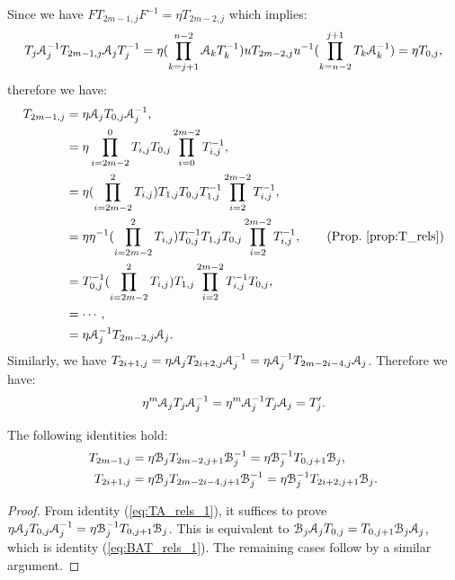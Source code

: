\documentclass{amsart}
\begin{document}
Since we have $FT_{2m-1,j}F^{-1}=\eta T_{2m-2,j}$ which implies: \[T_j\AA^{-1}_jT_{2m-1,j}\AA_jT_j^{-1}=\eta(\prod ^{n-2}_{k=j+1}\AA_kT_k^{-1}) uT_{2m-2,j}u^{-1}(\prod ^{j+1}_{k=n-2}T_k\AA^{-1}_k)=\eta T_{0,j},\] therefore we have:
\begin{equation}\label{eq:TA_rels_1}
\begin{aligned}
T_{2m-1,j}&=\eta \AA_jT_{0,j}\AA^{-1}_j,\\
&=\eta\prod^{0}_{i=2m-2}T_{i,j}T_{0,j}\prod^{2m-2}_{i=0}T^{-1}_{i,j},\\
&=\eta(\prod^{2}_{i=2m-2}T_{i,j})T_{1,j}T_{0,j}T^{-1}_{1,j}\prod^{2m-2}_{i=2}T^{-1}_{i,j},\\
&=\eta\eta^{-1}(\prod^{2}_{i=2m-2}T_{i,j})T^{-1}_{0,j}T_{1,j}T_{0,j}\prod^{2m-2}_{i=2}T^{-1}_{i,j},\qquad (\text{Prop.~\ref{prop:T_rels}})\\
&=T^{-1}_{0,j}(\prod^{2}_{i=2m-2}T_{i,j})T_{1,j}\prod^{2m-2}_{i=2}T^{-1}_{i,j}T_{0,j},\\
&=\cdots,\\
&=\eta \AA^{-1}_jT_{2m-2,j}\AA_j.     
\end{aligned}
\end{equation}
Similarly, we have $T_{2i+1,j}=\eta \AA_jT_{2i+2,j}\AA^{-1}_j=\eta \AA^{-1}_jT_{2m-2i-4,j}\AA_j$. Therefore we have:
\begin{equation}
\eta^{m} \AA_jT_j\AA^{-1}_j=\eta^{m} \AA^{-1}_jT_j\AA_j=T'_j.    
\end{equation}

\begin{lem}
The following identities hold:
\begin{align}
T_{2m-1,j}&=\eta \BB_jT_{2m-2,j+1}\BB^{-1}_j=\eta \BB^{-1}_jT_{0,j+1}\BB_j,\label{eq:TB_rels}\\
T_{2i+1,j}&=\eta\BB_jT_{2m-2i-4,j+1}\BB^{-1}_j=\eta \BB^{-1}_jT_{2i+2,j+1}\BB_j.
\end{align}
\end{lem}

\begin{proof}
From identity (\ref{eq:TA_rels_1}), it suffices to prove $\eta \AA_jT_{0,j}\AA^{-1}_j=\eta \BB^{-1}_jT_{0,j+1}\BB_j$. This is equivalent to $\BB_j\AA_jT_{0,j}=T_{0,j+1}\BB_j\AA_j$, which is identity (\ref{eq:BAT_rels_1}). The remaining cases follow by a similar argument.   
\end{proof}
\end{document}
